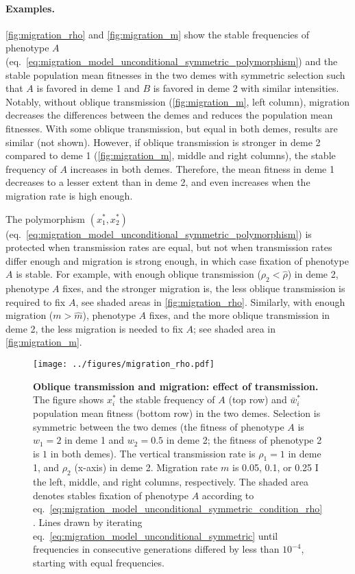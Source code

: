 \documentclass[11pt]{extarticle}
\begin{document}
\paragraph{Examples.}

\autoref{fig:migration_rho} and \autoref{fig:migration_m} show the stable frequencies of phenotype $A$~ (eq.~\ref{eq:migration_model_unconditional_symmetric_polymorphism}) and the stable population mean fitnesses in the two demes with symmetric selection such that $A$ is favored in deme 1 and $B$ is favored in deme 2 with similar intensities.
Notably, without oblique transmission (\autoref{fig:migration_m}, left column), migration decreases the differences between the demes and reduces the population mean fitnesses.
With some oblique transmission, but equal in both demes, results are similar (not shown).
However, if oblique transmission is stronger in deme 2 compared to deme 1 (\autoref{fig:migration_m}, middle and right columns), the stable frequency of $A$ increases in both demes.
Therefore, the mean fitness in deme 1 decreases to a lesser extent than in deme 2, and even increases when the migration rate is high enough.

The polymorphism $(x_1^*, x_2^*)$ (eq.~\ref{eq:migration_model_unconditional_symmetric_polymorphism}) is protected when transmission rates are equal, but not when transmission rates differ enough and migration is strong enough, in which case fixation of phenotype $A$ is stable. 
For example, with enough oblique transmission ($\rho_2<\hat \rho$) in deme 2, phenotype $A$ fixes, and the stronger migration is, the less oblique transmission is required to fix $A$, see shaded areas in \autoref{fig:migration_rho}.
Similarly, with enough migration ($m > \hat m$), phenotype $A$ fixes, and the more oblique transmission in deme 2, the less migration is needed to fix $A$; see shaded area in \autoref{fig:migration_m}.

\begin{figure*}[ht]
\centering
\texttt{[image: ../figures/migration\_rho.pdf]}
\caption{
\textbf{Oblique transmission and migration: effect of transmission.} 
The figure shows $x^*_i$ the stable frequency of $A$ (top row) and $\bar{w}^*_i$ population mean fitness (bottom row) in the two demes.
Selection is symmetric between the two demes (the fitness of phenotype $A$ is $w_1=2$ in deme 1 and $w_2=0.5$ in deme 2; the fitness of phenotype 2 is $1$ in both demes).
The vertical transmission rate is $\rho_1=1$ in deme 1, and $\rho_2$ (x-axis) in deme 2.
Migration rate $m$ is 0.05, 0.1, or 0.25 I the left, middle, and right columns, respectively.
The shaded area denotes stables fixation of phenotype $A$ according to eq.~\ref{eq:migration_model_unconditional_symmetric_condition_rho}.
Lines drawn by iterating eq.~\ref{eq:migration_model_unconditional_symmetric} until frequencies in consecutive generations differed by less than $10^{-4}$, starting with equal frequencies.
}
\label{fig:migration_rho}
\end{figure*}
\end{document}
